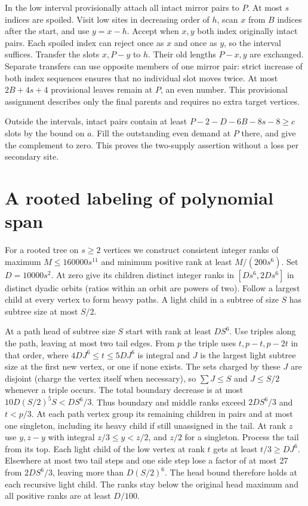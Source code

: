 In the low interval provisionally attach all intact mirror pairs to
$P$. At most $s$ indices are spoiled. Visit low sites in decreasing
order of $h$, scan $x$ from $B$ indices after the start, and use
$y=x-h$. Accept when $x,y$ both index originally intact pairs. Each
spoiled index can reject once as $x$ and once as $y$, so the interval
suffices. Transfer the slots $x,P-y$ to $h$. Their old lengths $P-x,y$
are exchanged. Separate transfers can use opposite members of one
mirror pair: strict increase of both index sequences ensures that
no individual slot moves twice. At most $2B+4s+4$ provisional leaves
remain at $P$, an even number. This provisional assignment describes
only the final parents and requires no extra target vertices.

Outside the intervals, intact pairs contain at least
$P-2-D-6B-8s-8\ge c$ slots by the bound on $a$. Fill the outstanding
even demand at $P$ there, and give the complement to zero. This proves
the two-supply assertion without a loss per secondary site.

\section{A rooted labeling of polynomial span}
For a rooted tree on $s\ge2$ vertices we construct consistent integer
ranks of maximum $M\le160000s^{11}$ and minimum positive rank at
least $M/(200s^6)$. Set $D=10000s^2$. At zero give its children
distinct integer ranks in $[Ds^6,2Ds^6]$ in distinct dyadic orbits
(ratios within an orbit are powers of two). Follow a largest child
at every vertex to form heavy paths. A light child in a subtree of
size $S$ has subtree size at most $S/2$.

At a path head of subtree size $S$ start with rank at least $DS^6$.
Use triples along the path, leaving at most two tail edges. From $p$
the triple uses $t,p-t,p-2t$ in that order, where
$4DJ^6\le t\le5DJ^6$ is integral and $J$ is the largest light subtree
size at the first new vertex, or one if none exists. The sets charged
by these $J$ are disjoint (charge the vertex itself when necessary),
so $\sum J\le S$ and $J\le S/2$ whenever a triple occurs.
The total boundary decrease is at most
$10D(S/2)^5S<DS^6/3$. Thus boundary and middle ranks exceed
$2DS^6/3$ and $t<p/3$. At each path vertex group its remaining children
in pairs and at most one singleton, including its heavy child if still
unassigned in the tail. At rank $z$ use $y,z-y$ with integral
$z/3\le y<z/2$, and $z/2$ for a singleton. Process the tail from
its top. Each light child of the low vertex at rank $t$ gets at least
$t/3\ge DJ^6$. Elsewhere at most two tail steps and one side step
lose a factor of at most 27 from $2DS^6/3$, leaving more than
$D(S/2)^6$. The head bound therefore holds at each recursive light
child. The ranks stay below the original head maximum and all positive
ranks are at least $D/100$.

